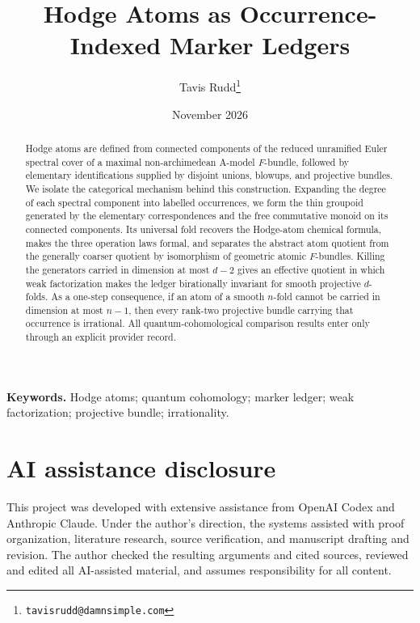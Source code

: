 \documentclass[11pt]{article}
\title{Hodge Atoms as Occurrence-Indexed Marker Ledgers}
\author{Tavis Rudd\thanks{\texttt{tavisrudd@damnsimple.com}}}
\date{November 2026}
\numberwithin{equation}{section}
\theoremstyle{definition}
\theoremstyle{remark}
\begin{document}
\maketitle

\begin{abstract}
Hodge atoms are defined from connected components of the reduced unramified
Euler spectral cover of a maximal non-archimedean A-model $F$-bundle,
followed by elementary identifications supplied by disjoint unions, blowups,
and projective bundles.  We isolate the categorical mechanism behind this
construction.  Expanding the degree of each spectral component into labelled
occurrences, we form the thin groupoid generated by the elementary
correspondences and the free commutative monoid on its connected components.
Its universal fold recovers the Hodge-atom chemical formula, makes the three
operation laws formal, and separates the abstract atom quotient from the
generally coarser quotient by isomorphism of geometric atomic $F$-bundles.
Killing the generators carried in dimension at most $d-2$ gives an effective
quotient in which weak factorization makes the ledger birationally invariant
for smooth projective $d$-folds.  As a one-step consequence, if an atom of a
smooth $n$-fold cannot be carried in dimension at most $n-1$, then every
rank-two projective bundle carrying that occurrence is irrational.  All
quantum-cohomological comparison results enter only through an explicit
provider record.
\end{abstract}

\noindent\textbf{Keywords.} Hodge atoms; quantum cohomology; marker ledger;
weak factorization; projective bundle; irrationality.






\section*{AI assistance disclosure}

This project was developed with extensive assistance from OpenAI Codex and
Anthropic Claude.  Under the author's direction, the systems assisted with
proof organization, literature research, source verification, and manuscript
drafting and revision.  The author checked the resulting arguments and cited
sources, reviewed and edited all AI-assisted material, and assumes
responsibility for all content.
\end{document}
